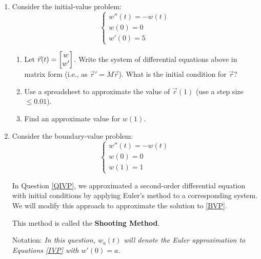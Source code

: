 \begin{enumerate}
	\item\label{QIVP} Consider the initial-value problem:
	      \begin{equation}\tag{IVP}\label{IVP}
		      \begin{cases}
			      w''(t) = -w(t) \\
			      w(0) = 0       \\
			      w'(0) = 5
		      \end{cases}
	      \end{equation}


	      \begin{enumerate}
		      \item Let $\vec{r}(t) = \begin{bmatrix}w \\ w'\end{bmatrix}$. 
			  Write the system of differential equations above in matrix form (i.e., as $\vec{r}'=M \vec{r}$). 
			  What is the initial condition for $\vec{r}$?
		      \item Use a spreadsheet to approximate the value of $\vec{r}(1)$ (use a step size $\leq 0.01$).
		      \item Find an approximate value for $w(1)$.
	      \end{enumerate}



	\item Consider the boundary-value problem:
	      \begin{equation}\tag{BVP}\label{BVP}
		      \begin{cases}
			      w''(t) = -w(t) \\
			      w(0) = 0       \\
			      w(1) = 1
		      \end{cases}
	      \end{equation}



	      In Question \ref{QIVP}, we approximated
		   a second-order differential equation with initial conditions by applying Euler's method to a corresponding system.
		   We will modify this approach to approximate the solution to \eqref{BVP}.

	      This method is called the \textbf{Shooting Method}.

	      Notation: \textit{In this question, $w_a(t)$ will denote the Euler approximation to Equations 
		  \eqref{IVP} with $w'(0)=a$.}



\end{enumerate}
